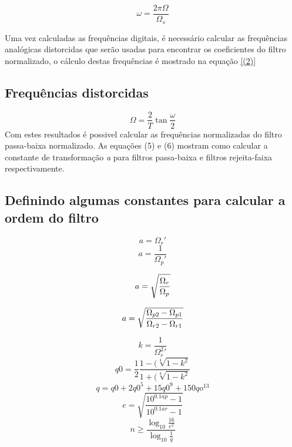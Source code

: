 \documentclass[a4paper,10pt]{article}
\begin{document}
	\begin{equation}\label{(1)}
		\omega = \frac{2\pi \Omega}{\Omega_{s}}
	\end{equation}	
	
	Uma vez calculadas as frequências digitais, é necessário calcular as frequências analógicas distorcidas que serão usadas para encontrar os coeficientes do filtro normalizado, o cálculo destas frequências é mostrado na equação \eqref{(2)}

\subsection{Frequências distorcidas \Omega}

	\begin{equation}\label{(2)}
		\Omega = \frac{2}{T}\tan\frac{\omega}{2}
	\end{equation}
	Com estes resultados é possivel calcular as frequências normalizadas do filtro passa-baixa normalizado. As equações (5) e (6) mostram como calcular a constante de transformação \textit{a} para filtros passa-baixa e filtros rejeita-faixa respectivamente.
	
\subsection{Definindo algumas constantes para calcular a ordem do filtro}
	
	
	\begin{equation}
		a = \Omega_{r}'
	\end{equation}
	\begin{equation}
		a = \frac{1}{\Omega_{p}'}
	\end{equation}
	
	\begin{equation}\label{valor de \textit{a} para filtros passa-baixa}
		a = \sqrt{\frac{\Omega_r}{\Omega_p}}
	\end{equation}
	
	\begin{equation}\label{valor de \textit{a} para filtros rejeita-faixa}
		a = \sqrt{\frac{\Omega_{p2} - \Omega_{p1}}{\Omega_{r2} - \Omega_{r1}}}	
	\end{equation}
	
	\begin{equation}
		k = \frac{1}{\Omega_r^{2}'}
	\end{equation}
	\begin{equation}
		q0 = {\frac{1}{2} \frac{1-(\sqrt[4]{1-k^{2}}}{1+(\sqrt[4]{1-k^{2}}}}
	\end{equation}
	\begin{equation}
		q = q0 + 2q0^{5} + 15q0^{9} + 150qo^{13} 
	\end{equation}
	\begin{equation}
		e = \sqrt{\frac{10^{0.1ap}-1}{10^{0.1ar}-1}}
	\end{equation}
	\begin{equation}
		n \geq \frac{\log_{10}\frac{16}{e^{2}}}{\log_{10}\frac{1}{q}}
	\end{equation}
	
\end{document}
